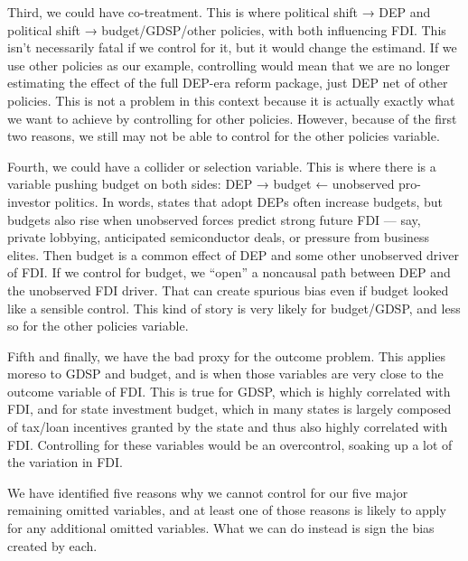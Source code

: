 \documentclass[doublespace,nopageskip]{UVAthesis}
\begin{document}
Third, we could have co-treatment. This is where political shift → DEP and political shift → budget/GDSP/other policies, with both influencing FDI. This isn't necessarily fatal if we control for it, but it would change the estimand. If we use other policies as our example, controlling would mean that we are no longer estimating the effect of the full DEP-era reform package, just DEP net of other policies. This is not a problem in this context because it is actually exactly what we want to achieve by controlling for other policies. However, because of the first two reasons, we still may not be able to control for the other policies variable.

Fourth, we could have a collider or selection variable. This is where there is a variable pushing budget on both sides: DEP → budget ← unobserved pro-investor politics. In words, states that adopt DEPs often increase budgets, but budgets also rise when unobserved forces predict strong future FDI — say, private lobbying, anticipated semiconductor deals, or pressure from business elites. Then budget is a common effect of DEP and some other unobserved driver of FDI. If we control for budget, we “open” a noncausal path between DEP and the unobserved FDI driver. That can create spurious bias even if budget looked like a sensible control. This kind of story is very likely for budget/GDSP, and less so for the other policies variable.

Fifth and finally, we have the bad proxy for the outcome problem. This applies moreso to GDSP and budget, and is when those variables are very close to the outcome variable of FDI. This is true for GDSP, which is highly correlated with FDI, and for state investment budget, which in many states is largely composed of tax/loan incentives granted by the state and thus also highly correlated with FDI. Controlling for these variables would be an overcontrol, soaking up a lot of the variation in FDI.

We have identified five reasons why we cannot control for our five major remaining omitted variables, and at least one of those reasons is likely to apply for any additional omitted variables. What we can do instead is sign the bias created by each. 
\end{document}
